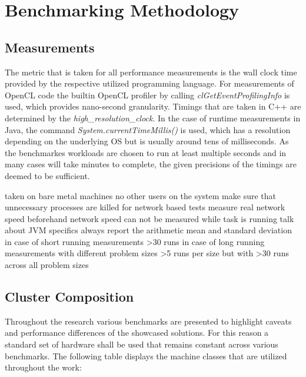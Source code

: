 \chapter{Benchmarking Methodology}
\label{benchmarking_methodology}
\section{Measurements}

The metric that is taken for all performance measurements is the wall clock time provided by the respective utilized programming language. For measurements of OpenCL code the builtin OpenCL profiler by calling \textit{clGetEventProfilingInfo} is used, which provides nano-second granularity. Timings that are taken in C++ are determined by the \textit{high\_resolution\_clock}. In the case of runtime measurements in Java, the command \textit{System.currentTimeMillis()} is used, which has a resolution depending on the underlying OS but is usually around tens of milliseconds. As the benchmarkes workloads are chosen to run at least multiple seconds and in many cases will take minutes to complete, the given precisions of the timings are deemed to be sufficient.


taken on bare metal machines
no other users on the system
make sure that unnecessary processes are killed
for network based tests measure real network speed beforehand
network speed can not be measured while task is running
talk about JVM specifics
always report the arithmetic mean and standard deviation
in case of short running measurements >30 runs
in case of long running measurements with different problem sizes >5 runs per size but with >30 runs across all problem sizes

\section{Cluster Composition}
\label{cluster_composition}
Throughout the research various benchmarks are presented to highlight caveats and performance differences of the showcased solutions. For this reason a standard set of hardware shall be used that remains constant across various benchmarks. The following table displays the machine classes that are utilized throughout the work:

